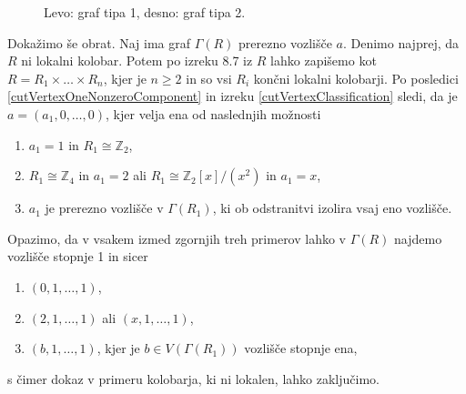 \documentclass[a4paper, 12pt]{amsart}
\theoremstyle{definition} %
\theoremstyle{plain} %
\newcommand{\Z}{\mathbb Z}
\begin{document}
\begin{figure}[h!]
\centering
\caption{Levo: graf tipa 1, desno: graf tipa 2.}
\label{tip1,2}
\end{figure}

Dokažimo še obrat. Naj ima graf $\Gamma(R)$ prerezno vozlišče $a$. Denimo najprej, da $R$ ni lokalni kolobar. Potem po izreku 8.7 iz \cite{Atiyah} $R$ lahko zapišemo kot $R=R_1 \times \dots \times R_n$, kjer je $n\ge 2$ in so vsi $R_i$ končni lokalni kolobarji. Po posledici \ref{cutVertexOneNonzeroComponent} in  izreku \ref{cutVertexClassification} sledi, da je $a = (a_1,0,\dots,0)$, kjer velja ena od naslednjih možnosti
\begin{enumerate}
\item $a_1 = 1$ in $R_1\cong \Z_2$,
\item $R_1 \cong \Z_4$ in $a_1 = 2$ ali $R_1 \cong \Z_2[x] / (x^2)$ in $a_1 = x$,
\item $a_1$ je prerezno vozlišče v $\Gamma(R_1)$, ki ob odstranitvi izolira vsaj eno vozlišče.
\end{enumerate}
Opazimo, da v vsakem izmed zgornjih treh primerov lahko v $\Gamma(R)$ najdemo vozlišče stopnje 1 in sicer 
\begin{enumerate}
\item $(0,1,\dots,1)$,
\item $(2,1,\dots,1)$ ali $(x,1,\dots,1)$,
\item $(b,1,\dots,1)$, kjer je $b\in V(\Gamma(R_1))$ vozlišče stopnje ena,
\end{enumerate}
s čimer dokaz v primeru kolobarja, ki ni lokalen, lahko zaključimo. 
\end{document}
